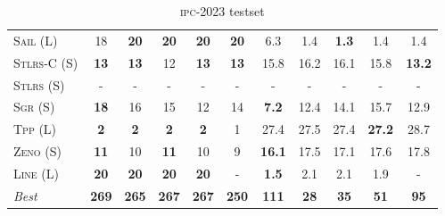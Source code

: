 \begin{table}[tb]
{\begin{tabular}{|l||ccccc||ccccc||}
\textsc{Sail} (L)&18&\textbf{20}&\textbf{20}&\textbf{20}&\textbf{20}&6.3&1.4&\textbf{1.3}&1.4&1.4\\
\textsc{Stlrs-C} (S)&\textbf{13}&\textbf{13}&12&\textbf{13}&\textbf{13}&15.8&16.2&16.1&15.8&\textbf{13.2}\\
\textsc{Stlrs} (S)&-&-&-&-&-&-&-&-&-&-\\
\textsc{Sgr} (S)&\textbf{18}&16&15&12&14&\textbf{7.2}&12.4&14.1&15.7&12.9\\
\textsc{Tpp} (L)&\textbf{2}&\textbf{2}&\textbf{2}&\textbf{2}&1&27.4&27.5&27.4&\textbf{27.2}&28.7\\
\textsc{Zeno} (S)&\textbf{11}&10&\textbf{11}&10&9&\textbf{16.1}&17.5&17.1&17.6&17.8\\
\textsc{Line} (L)&\textbf{20}&\textbf{20}&\textbf{20}&\textbf{20}&-&\textbf{1.5}&2.1&2.1&1.9&-
\\\hline
\textit{Best}&\textbf{269}&\textbf{265}&\textbf{267}&\textbf{267}&\textbf{250}&\textbf{111}&\textbf{28}&\textbf{35}&\textbf{51}&\textbf{95}\\\hline

        \end{tabular}}
        \caption{\textsc{ipc}-2023 testset}
        \label{tab:ipc}
        \end{table}
        